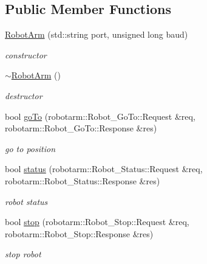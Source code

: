 \subsection*{Public Member Functions}
\begin{DoxyCompactItemize}
\item 
\hyperlink{class_robot_arm_aa3324f162a64eeb345cb6d2845f3822c}{Robot\+Arm} (std\+::string port, unsigned long baud)
\begin{DoxyCompactList}\small\item\em constructor \end{DoxyCompactList}\item 
\hyperlink{class_robot_arm_af3cf87fd2b5b060625eb49317632b83c}{$\sim$\+Robot\+Arm} ()
\begin{DoxyCompactList}\small\item\em destructor \end{DoxyCompactList}\item 
bool \hyperlink{class_robot_arm_a8b44092b92f889600d3e712c292b9c48}{go\+To} (robotarm\+::\+Robot\+\_\+\+Go\+To\+::\+Request \&req, robotarm\+::\+Robot\+\_\+\+Go\+To\+::\+Response \&res)
\begin{DoxyCompactList}\small\item\em go to position \end{DoxyCompactList}\item 
bool \hyperlink{class_robot_arm_a9bc2cbb9fb6252afffd43ed2a5f6113e}{status} (robotarm\+::\+Robot\+\_\+\+Status\+::\+Request \&req, robotarm\+::\+Robot\+\_\+\+Status\+::\+Response \&res)
\begin{DoxyCompactList}\small\item\em robot status \end{DoxyCompactList}\item 
bool \hyperlink{class_robot_arm_a645e7400a9e29525385d07e0b9552eb4}{stop} (robotarm\+::\+Robot\+\_\+\+Stop\+::\+Request \&req, robotarm\+::\+Robot\+\_\+\+Stop\+::\+Response \&res)
\begin{DoxyCompactList}\small\item\em stop robot \end{DoxyCompactList}\end{DoxyCompactItemize}
